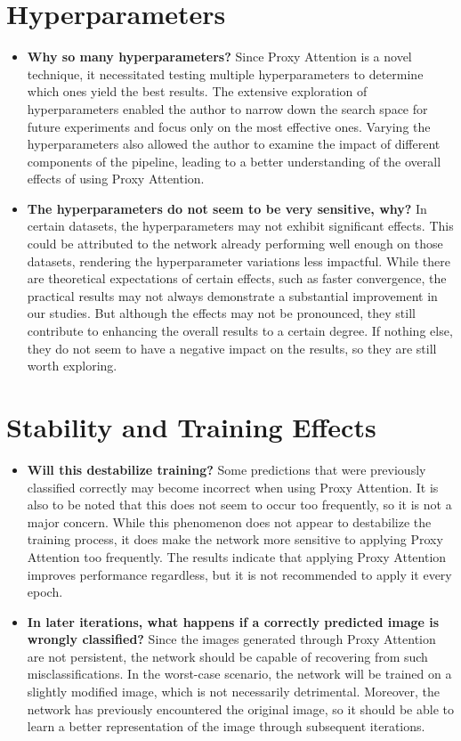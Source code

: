 \section{Hyperparameters}
\begin{itemize}
    \item \textbf{Why so many hyperparameters?} Since Proxy Attention is a novel technique, it necessitated testing multiple hyperparameters to determine which ones yield the best results. The extensive exploration of hyperparameters enabled the author to narrow down the search space for future experiments and focus only on the most effective ones. Varying the hyperparameters also allowed the author to examine the impact of different components of the pipeline, leading to a better understanding of the overall effects of using Proxy Attention.

    \item \textbf{The hyperparameters do not seem to be very sensitive, why?} In certain datasets, the hyperparameters may not exhibit significant effects. This could be attributed to the network already performing well enough on those datasets, rendering the hyperparameter variations less impactful. While there are theoretical expectations of certain effects, such as faster convergence, the practical results may not always demonstrate a substantial improvement in our studies. But although the effects may not be pronounced, they still contribute to enhancing the overall results to a certain degree. If nothing else, they do not seem to have a negative impact on the results, so they are still worth exploring.
\end{itemize}

\section{Stability and Training Effects}
\begin{itemize}
    \item \textbf{Will this destabilize training?} Some predictions that were previously classified correctly may become incorrect when using Proxy Attention. It is also to be noted that this does not seem to occur too frequently, so it is not a major concern. While this phenomenon does not appear to destabilize the training process, it does make the network more sensitive to applying Proxy Attention too frequently. The results indicate that applying Proxy Attention improves performance regardless, but it is not recommended to apply it every epoch. 

    \item \textbf{In later iterations, what happens if a correctly predicted image is wrongly classified?} Since the images generated through Proxy Attention are not persistent, the network should be capable of recovering from such misclassifications. In the worst-case scenario, the network will be trained on a slightly modified image, which is not necessarily detrimental. Moreover, the network has previously encountered the original image, so it should be able to learn a better representation of the image through subsequent iterations.

\end{itemize}
